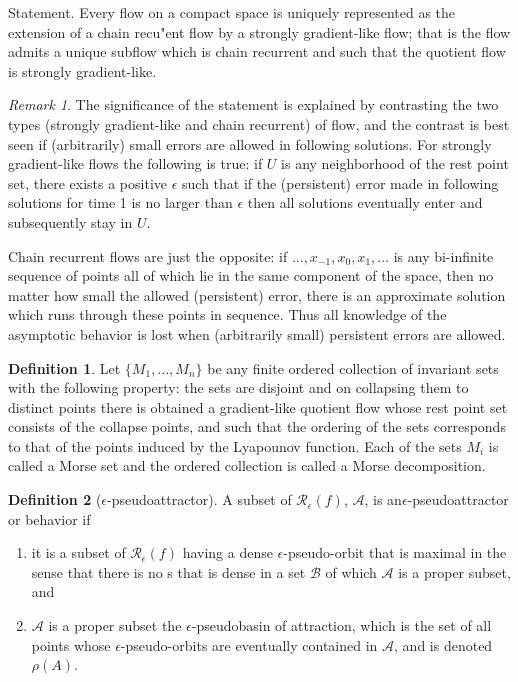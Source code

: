 \documentclass{scrartcl}
\theoremstyle{definition}
\newtheorem{definition}{Definition}
\theoremstyle{remark}
\newtheorem{remark}{Remark}
\begin{document}
Statement. Every flow on a compact space is uniquely represented as the extension of a chain recu"ent flow by a strongly gradient-like flow; that is the flow admits a unique subflow which is chain recurrent and such that the quotient flow is strongly gradient-like.

\begin{remark}\label{rem:error_noise}
The significance of the statement is explained by contrasting the two types (strongly gradient-like and chain recurrent) of flow, and the contrast is best seen if (arbitrarily) small errors are allowed in following solutions. For strongly gradient-like flows the following is true: if $U$ is any neighborhood of the rest point set, there exists a positive $\epsilon$ such that if the (persistent) error made in following solutions for time 1 is no larger than $\epsilon$ then all solutions eventually enter and subsequently stay in $U$.

Chain recurrent flows are just the opposite: if $\dots,x_{-1},x_0, x_{1},\dots$ is any bi-infinite sequence of points all of which lie in the same component of the space, then no matter how small the allowed (persistent) error, there is an approximate solution which runs through these points in sequence. Thus all knowledge of the asymptotic behavior is lost when (arbitrarily small) persistent errors are allowed.
\end{remark}

\begin{definition}
Let $\{M_1, \dots, M_n\}$ be any finite ordered collection of invariant sets with the following property: the sets are disjoint and on collapsing them to distinct points there is obtained a gradient-like quotient flow whose rest point set consists of the collapse points, and such that the ordering of the sets corresponds to that of the points induced by the Lyapounov function.
 Each of the sets $M_i$ is called a Morse set and the ordered collection is called a Morse decomposition.
\end{definition}

\begin{definition}[$\epsilon$-pseudoattractor]
A subset of $\mathcal{R}_\epsilon(f)$, $\mathcal{A}$, is an$\epsilon$-pseudoattractor or behavior if
\begin{enumerate}
\item  it is a subset of $\mathcal{R}_\epsilon(f)$ having a dense $\epsilon$-pseudo-orbit that is maximal in the sense that there is no s that is dense in a set            $\mathcal{B}$ of which  $\mathcal{A}$ is a proper subset, and
\item  $\mathcal{A}$ is a proper subset the $\epsilon$-pseudobasin of attraction, which is the set of all points whose $\epsilon$-pseudo-orbits are eventually contained in  $\mathcal{A}$, and is denoted $\rho(A)$.
\end{enumerate}
\end{definition}
\end{document}
